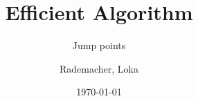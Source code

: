 \title[slide $\text{\insertframenumber}$]{Efficient Algorithm}
\subtitle{Jump points}
\author{Rademacher, Loka}
\date{\today}
